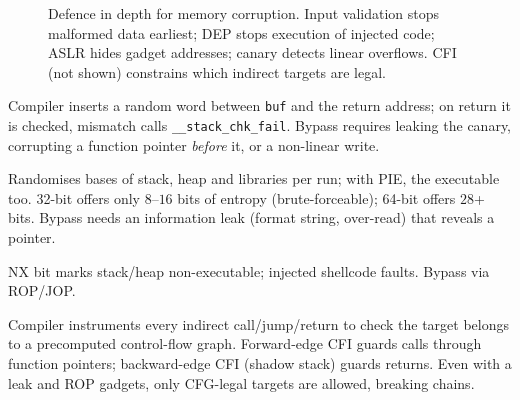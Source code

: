 \begin{figure}[h]\centering
{}%
\caption{Defence in depth for memory corruption. Input validation stops malformed data earliest; DEP stops execution of injected code; ASLR hides gadget addresses; canary detects linear overflows. CFI (not shown) constrains which indirect targets are legal.}
\label{fig:hardening-layers-mem}
\end{figure}

\begin{description}[leftmargin=1.2em,itemsep=0.35em]
    \item[Stack canaries] Compiler inserts a random word between \texttt{buf} and the return address; on return it is checked, mismatch calls \texttt{\_\_stack\_chk\_fail}. Bypass requires leaking the canary, corrupting a function pointer \emph{before} it, or a non-linear write.
    \item[ASLR] Randomises bases of stack, heap and libraries per run; with PIE, the executable too. 32-bit offers only $8$--$16$ bits of entropy (brute-forceable); 64-bit offers $28$+ bits. Bypass needs an information leak (format string, over-read) that reveals a pointer.
    \item[DEP/W$\oplus$X] NX bit marks stack/heap non-executable; injected shellcode faults. Bypass via ROP/JOP.
    \item[CFI] Compiler instruments every indirect call/jump/return to check the target belongs to a precomputed control-flow graph. Forward-edge CFI guards calls through function pointers; backward-edge CFI (shadow stack) guards returns. Even with a leak and ROP gadgets, only CFG-legal targets are allowed, breaking chains.
\end{description}

